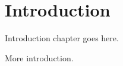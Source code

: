 \chapter{Introduction}
\thispagestyle{plainbottom}
Introduction chapter goes here.

\clearpage

More introduction\cite{Asner:2012xb}.
